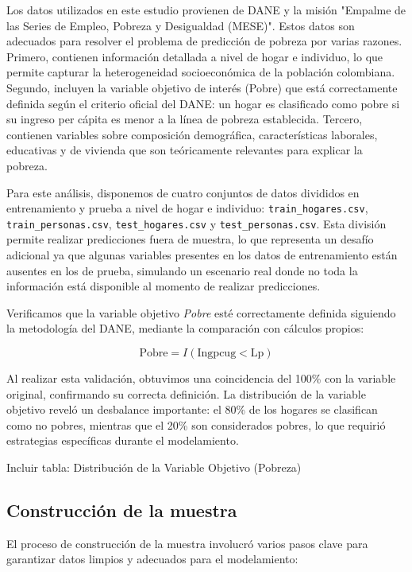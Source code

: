 \documentclass[12pt,a4paper,onecolumn]{article}
\begin{document}
Los datos utilizados en este estudio provienen de DANE y la misión "Empalme de las Series de Empleo, Pobreza y Desigualdad (MESE)". Estos datos son adecuados para resolver el problema de predicción de pobreza por varias razones. Primero, contienen información detallada a nivel de hogar e individuo, lo que permite capturar la heterogeneidad socioeconómica de la población colombiana. Segundo, incluyen la variable objetivo de interés (Pobre) que está correctamente definida según el criterio oficial del DANE: un hogar es clasificado como pobre si su ingreso per cápita es menor a la línea de pobreza establecida. Tercero, contienen variables sobre composición demográfica, características laborales, educativas y de vivienda que son teóricamente relevantes para explicar la pobreza.

Para este análisis, disponemos de cuatro conjuntos de datos divididos en entrenamiento y prueba a nivel de hogar e individuo: \texttt{train\_hogares.csv}, \texttt{train\_personas.csv}, \texttt{test\_hogares.csv} y \texttt{test\_personas.csv}. Esta división permite realizar predicciones fuera de muestra, lo que representa un desafío adicional ya que algunas variables presentes en los datos de entrenamiento están ausentes en los de prueba, simulando un escenario real donde no toda la información está disponible al momento de realizar predicciones.

Verificamos que la variable objetivo \textit{Pobre} esté correctamente definida siguiendo la metodología del DANE, mediante la comparación con cálculos propios:

\begin{equation}
\text{Pobre} = I(\text{Ingpcug} < \text{Lp})
\end{equation}

Al realizar esta validación, obtuvimos una coincidencia del 100\% con la variable original, confirmando su correcta definición. La distribución de la variable objetivo reveló un desbalance importante: el 80\% de los hogares se clasifican como no pobres, mientras que el 20\% son considerados pobres, lo que requirió estrategias específicas durante el modelamiento.

{\color{blue} Incluir tabla: Distribución de la Variable Objetivo (Pobreza)}

\subsection{Construcción de la muestra}

El proceso de construcción de la muestra involucró varios pasos clave para garantizar datos limpios y adecuados para el modelamiento:
\end{document}

